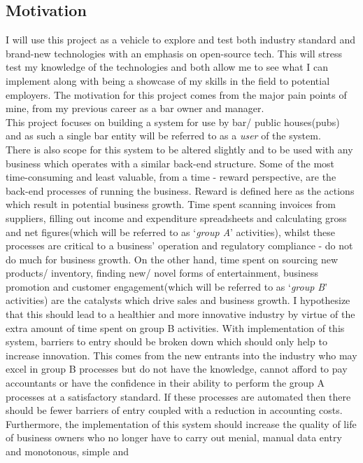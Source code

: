 \begin{flushleft}
	\subsection{Motivation}
	I will use this project as a vehicle to explore and test both industry standard and brand-new technologies with an emphasis on open-source tech. This will stress test my knowledge of the
	technologies and both allow me to see what I can implement along with being a showcase of my skills in the field to potential employers. \newline
	The motivation for this project comes from the major pain points of mine, from my previous career as a bar owner and manager. \\ This project focuses on building a system for use by 
	bar/ public houses(pubs) and as such a single bar entity will be referred to as a \emph{user} of the system.\\
	There is also scope for this system to be altered slightly and to be used with any business which operates with a similar back-end structure.
	\bigbreak
	Some of the most time-consuming and least valuable, from a time - reward perspective, are the back-end processes of running the business. Reward is defined here as the actions which result
	in potential business growth. Time spent scanning invoices from suppliers, filling out income and expenditure spreadsheets and calculating gross and net figures(which will be referred to 
	as ‘\emph{group A}’ activities), whilst these processes are critical to a business’ operation and regulatory compliance - do not do much for business growth. 
	On the other hand, time spent on sourcing new products/ inventory, finding new/ novel forms of entertainment, business promotion and customer engagement(which will be referred to as 
	‘\emph{group B}’ activities) are the catalysts which drive sales and business growth.
	\bigbreak
	I hypothesize that this should lead to a healthier and more innovative industry by virtue of the extra amount of time spent on group B activities. With implementation of this system,
	barriers to entry should be broken down which should only help to increase innovation. This comes from the new entrants into the industry who may excel in group B processes but do not have 
	the knowledge, cannot afford to pay accountants or have the confidence in their ability to perform the group A processes at a satisfactory standard. If these processes are automated then 
	there should be fewer barriers of entry coupled with a reduction in accounting costs.
	Furthermore, the implementation of this system should increase the quality of life of business owners who no longer have to carry out menial, manual data entry and monotonous, simple and 

\end{flushleft}
